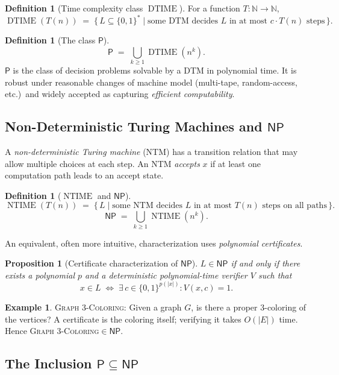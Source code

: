 \documentclass[12pt,a4paper]{amsart}
\newtheorem{proposition}[theorem]{Proposition}
\theoremstyle{definition}
\newtheorem{definition}[theorem]{Definition}
\newtheorem{example}[theorem]{Example}
\newcommand{\Pclass}{\mathsf{P}}
\newcommand{\NP}{\mathsf{NP}}
\newcommand{\N}{\mathbb{N}}
\DeclareMathOperator{\DTIME}{DTIME}
\DeclareMathOperator{\NTIME}{NTIME}
\begin{document}
\begin{definition}[Time complexity class $\DTIME$]
For a function $T\colon\N\to\N$,
\[
  \DTIME(T(n)) \;=\;
  \bigl\{\,L\subseteq\{0,1\}^* \;\big|\;
    \text{some DTM decides }L\text{ in at most }c\cdot T(n)\text{ steps}\,\bigr\}.
\]
\end{definition}

\begin{definition}[The class $\Pclass$]
\[
  \Pclass \;=\; \bigcup_{k\geq 1} \DTIME(n^k).
\]
$\Pclass$ is the class of decision problems solvable by a DTM in polynomial
time.  It is robust under reasonable changes of machine model (multi-tape,
random-access, etc.)\ and widely accepted as capturing \emph{efficient
computability}.
\end{definition}

\subsection{Non-Deterministic Turing Machines and $\NP$}

A \emph{non-deterministic Turing machine} (NTM) has a transition relation that
may allow multiple choices at each step.  An NTM \emph{accepts} $x$ if at least
one computation path leads to an accept state.

\begin{definition}[$\NTIME$ and $\NP$]
\[
  \NTIME(T(n)) \;=\;
  \bigl\{\,L \;\big|\;
    \text{some NTM decides }L\text{ in at most }T(n)\text{ steps on all paths}\,\bigr\}.
\]
\[
  \NP \;=\; \bigcup_{k\geq 1} \NTIME(n^k).
\]
\end{definition}

An equivalent, often more intuitive, characterization uses \emph{polynomial
certificates}.

\begin{proposition}[Certificate characterization of $\NP$]
$L\in\NP$ if and only if there exists a polynomial $p$ and a deterministic
polynomial-time verifier $V$ such that
\[
  x\in L \;\iff\; \exists\,c\in\{0,1\}^{p(|x|)}: V(x,c) = 1.
\]
\end{proposition}

\begin{example}
  \textsc{Graph 3-Coloring}: Given a graph $G$, is there a proper 3-coloring
  of the vertices?  A certificate is the coloring itself; verifying it takes
  $O(|E|)$ time.  Hence \textsc{Graph 3-Coloring}$\in\NP$.
\end{example}

\subsection{The Inclusion $\Pclass\subseteq\NP$}
\end{document}
